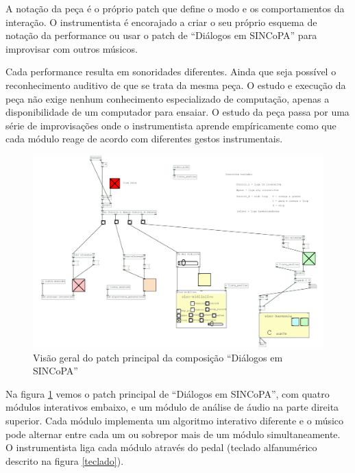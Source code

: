 \documentclass{ppgmus}
\begin{document}
A notação da peça é o próprio patch que define o modo e os comportamentos
da interação. O instrumentista é encorajado a criar o seu próprio esquema
de notação da performance ou usar o patch de ``Diálogos em SINCoPA'' para
improvisar com outros músicos.

Cada performance resulta em sonoridades diferentes. Ainda que seja possível o
reconhecimento auditivo de que se trata da mesma peça. O estudo e execução da peça
não exige nenhum conhecimento especializado de computação, apenas a disponibilidade de um 
computador para ensaiar. O estudo da peça passa por uma série de improvisações onde
o instrumentista aprende empíricamente como que cada módulo reage de acordo com
diferentes gestos instrumentais.

\begin{figure}
\includegraphics[scale=.4]{comp}
\caption{Visão geral do patch principal da composição ``Diálogos em SINCoPA''}
\label{comp}
\end{figure}

Na figura \ref{comp} vemos o patch principal de ``Diálogos em SINCoPA'', com quatro
módulos interativos embaixo, e um módulo de análise de áudio na parte direita superior.
Cada módulo implementa um algoritmo interativo diferente e o músico pode alternar 
entre cada um ou sobrepor mais de um módulo simultaneamente. O instrumentista
liga cada módulo através do pedal (teclado alfanumérico descrito na figura \ref{teclado}).
\end{document}
